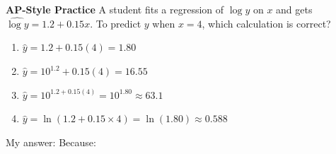 \documentclass[10pt]{article}
\begin{document}
\begin{tcolorbox}[colback=redbg, colframe=redacc, boxrule=0.8pt, arc=2mm,
    left=4mm, right=4mm, top=2.5mm, bottom=2.5mm]
\small\textbf{AP-Style Practice}\enspace
A student fits a regression of $\log y$ on $x$ and gets $\widehat{\log y} = 1.2 + 0.15x$.
To predict $y$ when $x = 4$, which calculation is correct?

\vspace{7pt}
\begin{enumerate}[label=\textbf{(\Alph*)}, leftmargin=2em, itemsep=4pt]
  \item $\hat{y} = 1.2 + 0.15(4) = 1.80$
  \item $\hat{y} = 10^{1.2} + 0.15(4) = 16.55$
  \item $\hat{y} = 10^{1.2 + 0.15(4)} = 10^{1.80} \approx 63.1$
  \item $\hat{y} = \ln(1.2 + 0.15 \times 4) = \ln(1.80) \approx 0.588$
\end{enumerate}
\end{tcolorbox}

\vspace{0.08in}
\noindent\textcolor{slate}{\small My answer: \blank{1cm} \quad Because: \blank{8.5cm}}
\end{document}
